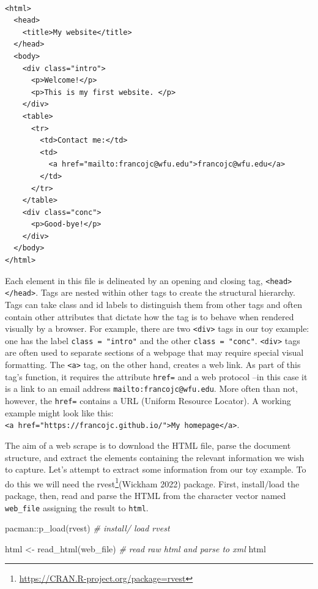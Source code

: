 \documentclass[
  letterpaper,
]{latex/krantz}
\newenvironment{Shaded}{\begin{snugshade}}{\end{snugshade}}
\newcommand{\CommentTok}[1]{\textcolor[rgb]{0.00,0.00,0.00}{\textit{#1}}}
\newcommand{\FunctionTok}[1]{\textcolor[rgb]{0.00,0.00,0.00}{#1}}
\newcommand{\NormalTok}[1]{\textcolor[rgb]{0.00,0.00,0.00}{#1}}
\newcommand{\OtherTok}[1]{\textcolor[rgb]{0.00,0.00,0.00}{#1}}
\newcommand{\SpecialCharTok}[1]{\textcolor[rgb]{0.00,0.00,0.00}{#1}}
\DeclareRobustCommand{\href}[2]{#2\footnote{\url{#1}}}
\begin{document}
\begin{verbatim}

<html>
  <head>
    <title>My website</title>
  </head>
  <body>
    <div class="intro">
      <p>Welcome!</p>
      <p>This is my first website. </p>
    </div>
    <table>
      <tr>
        <td>Contact me:</td>
        <td>
          <a href="mailto:francojc@wfu.edu">francojc@wfu.edu</a>
        </td>
      </tr>
    </table>
    <div class="conc">
      <p>Good-bye!</p>
    </div>
  </body>
</html>
\end{verbatim}

Each element in this file is delineated by an opening and closing tag,
\texttt{\textless{}head\textgreater{}\textless{}/head\textgreater{}}.
Tags are nested within other tags to create the structural hierarchy.
Tags can take class and id labels to distinguish them from other tags
and often contain other attributes that dictate how the tag is to behave
when rendered visually by a browser. For example, there are two
\texttt{\textless{}div\textgreater{}} tags in our toy example: one has
the label \texttt{class\ =\ "intro"} and the other
\texttt{class\ =\ "conc"}. \texttt{\textless{}div\textgreater{}} tags
are often used to separate sections of a webpage that may require
special visual formatting. The \texttt{\textless{}a\textgreater{}} tag,
on the other hand, creates a web link. As part of this tag's function,
it requires the attribute \texttt{href=} and a web protocol --in this
case it is a link to an email address \texttt{mailto:francojc@wfu.edu}.
More often than not, however, the \texttt{href=} contains a URL (Uniform
Resource Locator). A working example might look like this:
\texttt{\textless{}a\ href="https://francojc.github.io/"\textgreater{}My\ homepage\textless{}/a\textgreater{}}.

The aim of a web scrape is to download the HTML file, parse the document
structure, and extract the elements containing the relevant information
we wish to capture. Let's attempt to extract some information from our
toy example. To do this we will need the
\href{https://CRAN.R-project.org/package=rvest}{rvest}(Wickham 2022)
package. First, install/load the package, then, read and parse the HTML
from the character vector named \texttt{web\_file} assigning the result
to \texttt{html}.

\begin{Shaded}
\begin{Highlighting}[]
\NormalTok{pacman}\SpecialCharTok{::}\FunctionTok{p\_load}\NormalTok{(rvest) }\CommentTok{\# install/ load \textasciigrave{}rvest\textasciigrave{}}

\NormalTok{html }\OtherTok{\textless{}{-}} \FunctionTok{read\_html}\NormalTok{(web\_file) }\CommentTok{\# read raw html and parse to xml}
\NormalTok{html}
\end{Highlighting}
\end{Shaded}
\end{document}
